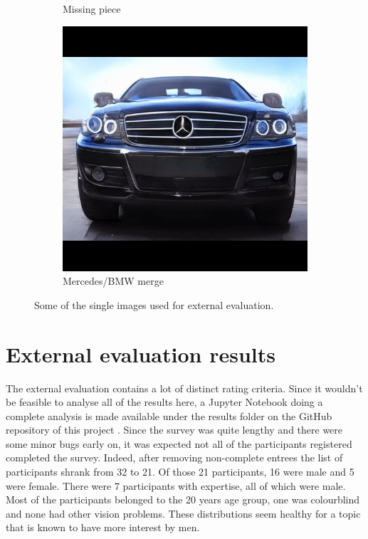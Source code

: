 \begin{figure}
\begin{subfigure}{.3\textwidth}
  \caption{Missing piece}
  \label{fig:survey_missing}
\end{subfigure}
\hspace{.02\textwidth}
\begin{subfigure}{.3\textwidth}
  \centering
  \includegraphics[width=\textwidth]{images/single4.png}
  \caption{Mercedes/BMW merge}
  \label{fig:survey_merged}
\end{subfigure}
\captionsetup{width=.85\linewidth}
\captionsetup{justification=centering}
\caption{Some of the single images used for external evaluation.}
\label{fig:singlesurvey}
\end{figure}



\clearpage
\section{External evaluation results}
\label{sec:external_evaluation_results}

The external evaluation contains a lot of distinct rating criteria.
Since it wouldn't be feasible to analyse all of the results here, a Jupyter Notebook doing a complete analysis is made available under the results folder on the GitHub repository of this project \citep{github_project}.
Since the survey was quite lengthy and there were some minor bugs early on, it was expected not all of the participants registered completed the survey.
Indeed, after removing non-complete entrees the list of participants shrank from 32 to 21.
Of those 21 participants, 16 were male and 5 were female.
There were 7 participants with expertise, all of which were male.
Most of the participants belonged to the 20 years age group, one was colourblind and none had other vision problems.
These distributions seem healthy for a topic that is known to have more interest by men.


